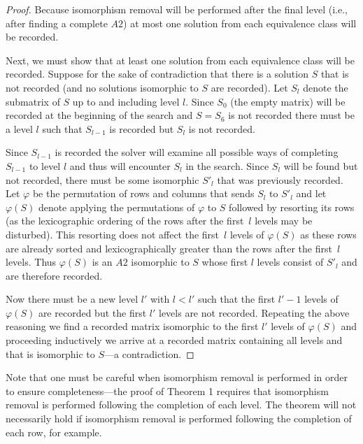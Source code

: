 \documentclass[letterpaper]{article}
\begin{document}
\begin{proof}
Because isomorphism removal will be performed after
the final level (i.e., after finding a complete $A2$)
at most one solution from each equivalence class will be recorded.

Next, we must show that at least one solution from each equivalence
class will be recorded.
Suppose for the sake of contradiction that there is a solution $S$
that is not recorded (and no solutions isomorphic to $S$ are recorded).
Let $S_l$ denote the submatrix of $S$ up to and including level $l$.
Since $S_0$ (the empty matrix) will be recorded at the beginning of the
search and $S=S_6$ is not recorded there must be a level $l$ such that
$S_{l-1}$ is recorded but $S_{l}$ is not recorded.

Since $S_{l-1}$ is recorded the solver will examine all possible ways
of completing $S_{l-1}$ to level $l$ and thus will encounter $S_l$
in the search.  Since $S_l$ will be found but not recorded, there must be some isomorphic
$S'_l$ that was previously recorded.  Let $\varphi$ be the permutation
of rows and columns that sends $S_l$ to $S'_l$ and let $\varphi(S)$
denote applying the permutations of $\varphi$ to $S$
followed by resorting its rows
(as the lexicographic ordering of the rows after the first~$l$ levels may be disturbed).
This resorting does not affect the first~$l$ levels of $\varphi(S)$ as
these rows are already sorted and lexicographically greater than the rows
after the first~$l$ levels.
Thus $\varphi(S)$ is an $A2$ isomorphic to $S$ whose first $l$
levels consist of $S'_l$ and are therefore recorded.

Now there must be a new level $l'$ with $l<l'$ such that
the first $l'-1$ levels of $\varphi(S)$ are recorded but the first
$l'$ levels are not recorded.  Repeating the above reasoning
we find a recorded matrix isomorphic to the first $l'$ levels of $\varphi(S)$
and proceeding inductively we arrive at a recorded matrix containing all
levels and that is isomorphic to $S$---a contradiction.
\end{proof}

Note that one must be careful when isomorphism removal
is performed in order to ensure completeness---the proof of Theorem 1 requires that
isomorphism removal is performed following the completion
of each level.  The theorem will not necessarily hold if isomorphism removal
is performed following the completion of each row, for example.
\end{document}
